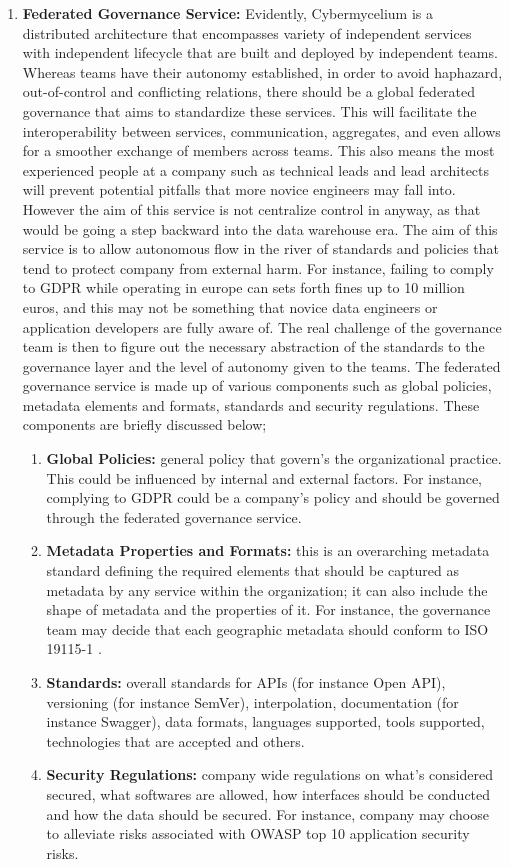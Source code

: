 \documentclass[review]{elsarticle}
\begin{document}
\begin{enumerate}
    
    \item  \textbf{Federated Governance Service:} Evidently, Cybermycelium is a distributed architecture that encompasses variety of independent services with independent lifecycle that are built and deployed by independent teams. Whereas teams have their autonomy established, in order to avoid haphazard, out-of-control and conflicting relations, there should be a global federated governance that aims to standardize these services. This will facilitate the interoperability between services, communication, aggregates, and even allows for a smoother exchange of members across teams. This also means the most experienced people at a company such as technical leads and lead architects will prevent potential pitfalls that more novice engineers may fall into. However the aim of this service is not centralize control in anyway, as that would be going a step backward into the data warehouse era. The aim of this service is to allow autonomous flow in the river of standards and policies that tend to protect company from external harm. For instance, failing to comply to GDPR while operating in europe can sets forth fines up to 10 million euros, and this may not be something that novice data engineers or application developers are fully aware of. The real challenge of the governance team is then to figure out the necessary abstraction of the standards to the governance layer and the level of autonomy given to the teams. The federated governance service is made up of various components such as global policies, metadata elements and formats, standards and security regulations. These components are briefly discussed below;
    \begin{enumerate}
        \item \textbf{Global Policies:} general policy that govern's the organizational practice. This could be influenced by internal and external factors. For instance, complying to GDPR could be a company's policy and should be governed through the federated governance service.
        \item \textbf{Metadata Properties and Formats:} this is an overarching metadata standard defining the required elements that should be captured as metadata by any service within the organization; it can also include the shape of metadata and the properties of it. For instance, the governance team may decide that each geographic metadata should conform to ISO 19115-1 \cite{ISOMetadata}.
        \item \textbf{Standards:} overall standards for APIs (for instance Open API), versioning (for instance SemVer), interpolation, documentation (for instance Swagger), data formats, languages supported, tools supported, technologies that are accepted and others.
        \item \textbf{Security Regulations:} company wide regulations on what's considered secured, what softwares are allowed, how interfaces should be conducted and how the data should be secured. For instance, company may choose to alleviate risks associated with OWASP top 10 application security risks.
    \end{enumerate}


\end{enumerate}
\end{document}
